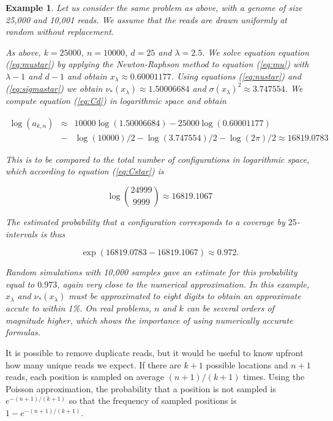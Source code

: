 \documentclass{article}
\newtheorem{example}{Example}
\begin{document}
\begin{example}

Let us consider the same problem as above, with a genome of size 25,000
and 10,001 reads. We assume that the reads are drawn uniformly at random
without replacement.

As above, $k=25000$, $n=10000$, $d=25$ and $\lambda = 2.5$. We solve
equation equation (\ref{eq:mustar}) by applying the Newton-Raphson method
to equation (\ref{eq:mu}) with $\lambda-1$ and $d-1$ and obtain
$x_\lambda \approx 0.60001177$. Using equations (\ref{eq:nustar}) and
(\ref{eq:sigmastar}) we obtain $\nu_*(x_\lambda) \approx 1.50006684$ and
$\sigma(x_\lambda)^2 \approx 3.747554$. We compute equation
(\ref{eq:Cd}) in logarithmic space and obtain

\begin{eqnarray*}
\log(a_{k,n}) &\approx& 10000\log(1.50006684) - 25000\log(0.60001177) \\
&-& \log(10000)/2 - \log(3.747554)/2 - \log(2\pi)/2
\approx 16819.0783
\end{eqnarray*}

This is to be compared to the total number of configurations in
logarithmic space, which according to equation (\ref{eq:Cstar}) is

\begin{equation*}
\log { 24999 \choose 9999 } \approx 16819.1067
\end{equation*}

The estimated probability that a configuration corresponds to a coverage
by $25$-intervals is
thus

\begin{equation*}
\exp(16819.0783-16819.1067) \approx 0.972.
\end{equation*}

Random simulations with 10,000 samples gave an estimate for this
probability equal to $0.973$, again very close to the numerical
approximation. In this example, $x_\lambda$ and $\nu_*(x_\lambda)$ must be
approximated to eight digits to obtain an approximate accute to within
1\%. On real problems, $n$ and $k$ can be several orders of magnitude
higher, which shows the importance of using numerically accurate formulas.

\end{example}

It is possible to remove duplicate reads, but it would be useful to know
upfront how many unique reads we expect. If there are $k+1$ possible
locations and $n+1$ reads, each position is sampled on average
$(n+1)/(k+1)$ times. Using the Poisson approximation, the probability that
a position is not sampled is $e^{-(n+1)/(k+1)}$ so that the frequency of
sampled positions is $1-e^{-(n+1)/(k+1)}$.
\end{document}
